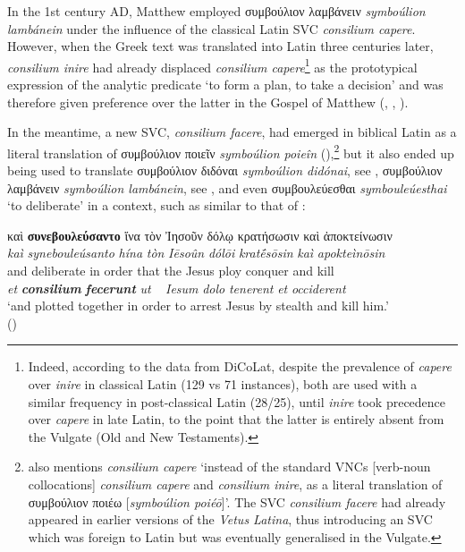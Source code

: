 \documentclass[output=paper,colorlinks,citecolor=brown]{langscibook}
\begin{document}
In the 1st century AD, Matthew
employed συμβούλιον λαμβάνειν \emph{symboúlion lambánein} under the influence of the
classical Latin SVC \emph{consilium capere}. However, when the Greek text was translated
into Latin three centuries later, \emph{consilium inire} had already displaced
\emph{consilium capere}\footnote{Indeed, according to the data from DiCoLat, despite the
  prevalence of \emph{capere} over \emph{inire} in classical Latin (129 vs 71 instances),
  both are used with a similar frequency in post-classical Latin (28/25), until \emph{inire}
  took precedence over \emph{capere} in late Latin, to the point that the latter is
  entirely absent from the Vulgate (Old and New Testaments).} as the prototypical
expression of the analytic predicate `to form a plan, to take a decision' and was
therefore given preference over the latter in the Gospel of Matthew (, ,
). 


In the meantime, a new SVC, \emph{consilium facere}, had emerged in biblical Latin
as a literal translation of συμβούλιον ποιεῖν \emph{symboúlion poieîn} (),\footnote{\citet[126--127]{Burton2000} also mentions \emph{consilium capere}
  `instead of the standard VNCs [verb-noun collocations] \emph{consilium capere} and \emph{consilium inire}, as a
  literal translation of συμβούλιον ποιέω [\emph{symboúlion poiéō}]'. The SVC
  \emph{consilium facere} had already appeared in earlier versions of the \textit{Vetus Latina}, thus
  introducing an SVC which was foreign to Latin but was eventually generalised in the
  Vulgate.} but it also ended up being used to translate συμβούλιον διδόναι
\emph{symboúlion didónai}, see , συμβούλιον λαμβάνειν \emph{symboúlion
  lambánein}, see , and even συμβουλεύεσθαι \emph{symbouleúesthai} `to
deliberate' in a context, such as  similar to that of :



\ea\label{ex:bj:21}

\gllll καὶ \textbf{συνεβουλεύσαντο} ἵνα τὸν Ἰησοῦν δόλῳ κρατήσωσιν καὶ ἀποκτείνωσιν\\
 \textit{kaì} \textit{synebouleúsanto} \textit{hína} \textit{tòn} \textit{Iēsoûn} \textit{dólōi} \textit{kratḗsōsin} \textit{kaì} \textit{apokteìnōsin}\\
and deliberate {in order that} the Jesus ploy conquer and kill\\
\emph{et} {\textbf{\itshape consilium} \textbf{\itshape fecerunt}} \emph{ut} ~ \emph{Iesum} \emph{dolo} \emph{tenerent} \emph{et} \emph{occiderent}\\
\glt `and plotted together in order to arrest Jesus by stealth and kill him.' \\
\hspace*{\fill}()
\end{document}
